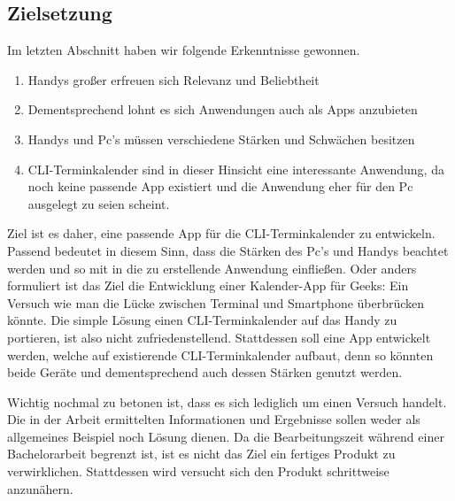 \subsection{Zielsetzung}\label{section:zielsetzung} \myCheckmark

Im letzten Abschnitt haben wir folgende Erkenntnisse gewonnen.
\begin{enumerate}
	\item Handys großer erfreuen sich Relevanz und Beliebtheit
	\item Dementsprechend lohnt es sich Anwendungen auch als Apps anzubieten
	\item Handys und Pc's müssen verschiedene Stärken und Schwächen besitzen
	\item CLI-Terminkalender sind in dieser Hinsicht eine interessante Anwendung, da noch keine passende App existiert und die Anwendung eher für den Pc ausgelegt zu seien scheint.
\end{enumerate}

\myNewSection
Ziel ist es daher, eine passende App für die CLI-Terminkalender zu entwickeln. Passend bedeutet in diesem Sinn, dass die Stärken des Pc's und Handys beachtet werden und so mit in die zu erstellende Anwendung einfließen.\newline%
Oder anders formuliert ist das Ziel die \glqq Entwicklung einer Kalender-App für Geeks: Ein Versuch wie man die Lücke zwischen Terminal und Smartphone überbrücken könnte\grqq{}.\newline%
Die simple Lösung einen CLI-Terminkalender auf das Handy zu portieren, ist also nicht zufriedenstellend. Stattdessen soll eine App entwickelt werden, welche auf existierende CLI-Terminkalender aufbaut, denn so könnten beide Geräte und dementsprechend auch dessen Stärken genutzt werden.

\myNewSection
Wichtig nochmal zu betonen ist, dass es sich lediglich um einen Versuch handelt. Die in der Arbeit ermittelten Informationen und Ergebnisse sollen weder als allgemeines Beispiel noch Lösung dienen.\newline%
Da die Bearbeitungszeit während einer Bachelorarbeit begrenzt ist, ist es nicht das Ziel ein fertiges Produkt zu verwirklichen. Stattdessen wird versucht sich den Produkt schrittweise anzunähern.%

